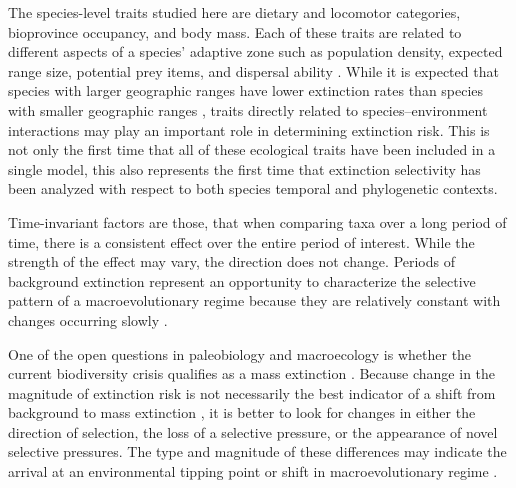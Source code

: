 \documentclass[12pt]{article}
\begin{document}
The species-level traits studied here are dietary and locomotor categories, bioprovince occupancy, and body mass. Each of these traits are related to different aspects of a species' adaptive zone such as population density, expected range size, potential prey items, and dispersal ability \cite{Smith2004,Jernvall2004}. While it is expected that species with larger geographic ranges have lower extinction rates than species with smaller geographic ranges \cite{Jablonski1986,Roy2009c}, traits directly related to species--environment interactions may play an important role in determining extinction risk. This is not only the first time that all of these ecological traits have been included in a single model, this also represents the first time that extinction selectivity has been analyzed with respect to both species temporal and phylogenetic contexts.

Time-invariant factors are those, that when comparing taxa over a long period of time, there is a consistent effect over the entire period of interest. While the strength of the effect may vary, the direction does not change. Periods of background extinction represent an opportunity to characterize the selective pattern of a macroevolutionary regime because they are relatively constant with changes occurring slowly \cite{Jablonski1986,Raup1988}.

One of the open questions in paleobiology and macroecology is whether the current biodiversity crisis qualifies as a mass extinction \cite{Alroy2010,Barnosky2011,Barnosky2012a}. Because change in the magnitude of extinction risk is not necessarily the best indicator of a shift from background to mass extinction \cite{Wang2003}, it is better to look for changes in either the direction of selection, the loss of a selective pressure, or the appearance of novel selective pressures. The type and magnitude of these differences may indicate the arrival at an environmental tipping point or shift in macroevolutionary regime \cite{Jablonski1986}.
\end{document}
